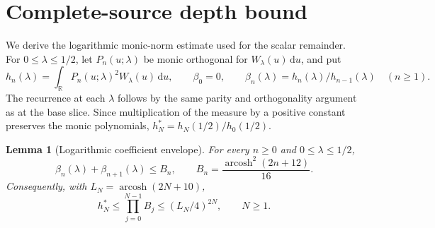 \documentclass[11pt]{article}
\numberwithin{equation}{section}
\newtheorem{lemma}[theorem]{Lemma}
\DeclareMathOperator{\arcosh}{arcosh}
\newcommand{\R}{\mathbb R}
\newcommand{\dd}{\,\mathrm d}
\begin{document}
\section{Complete-source depth bound}\label{sec:depth}

We derive the logarithmic monic-norm estimate used for the
scalar remainder. For \(0\le\lambda\le1/2\), let \(P_n(u;\lambda)\)
be monic orthogonal for \(W_\lambda(u)\dd u\), and put
\[
 h_n(\lambda)=\int_{\R}P_n(u;\lambda)^2W_\lambda(u)\dd u,
 \qquad \beta_0=0,\qquad
 \beta_n(\lambda)=h_n(\lambda)/h_{n-1}(\lambda)\quad(n\ge1).
\]
The recurrence at each \(\lambda\) follows by the same parity
and orthogonality argument as at the base slice. Since multiplication
of the measure by a positive constant preserves the monic
polynomials, \(h_N^*=h_N(1/2)/h_0(1/2)\).

\begin{lemma}[Logarithmic coefficient envelope]\label{lem:log}
For every \(n\ge0\) and \(0\le\lambda\le1/2\),
\[
 \beta_n(\lambda)+\beta_{n+1}(\lambda)
       \le B_n,\qquad B_n=\frac{\arcosh^2(2n+12)}{16}.
\]
Consequently, with \(L_N=\arcosh(2N+10)\),
\begin{equation}\label{eq:log}
 h_N^*\le\prod_{j=0}^{N-1}B_j\le (L_N/4)^{2N},\qquad N\ge1.
\end{equation}
\end{lemma}
\end{document}
